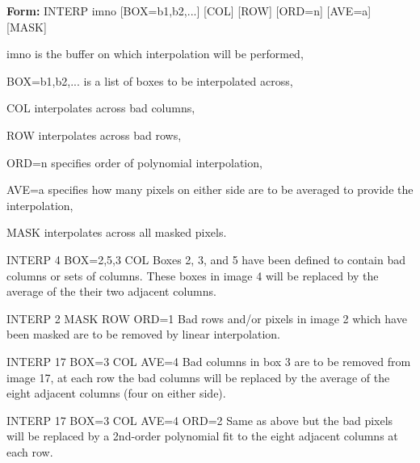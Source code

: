 {\newpage\clearpage
{}%
\begin{command}
  \item[\textbf{Form: }INTERP imno {[BOX=b1,b2,...]} {[COL]} {[ROW]} {[ORD=n]} {[AVE=a]} {[MASK]}\hfill]{}
  \item[imno]{is the buffer on which interpolation will be performed,}
  \item[BOX=b1,b2,...]{is a list of boxes to be interpolated across,}
  \item[COL]{interpolates across bad columns,}
  \item[ROW]{interpolates across bad rows,}
  \item[ORD=n]{specifies order of polynomial interpolation,}
  \item[AVE=a]{specifies how many pixels on either side are to be averaged 
       to provide the interpolation,}
  \item[MASK]{interpolates across all masked pixels.}
\end{command}%
\lthtmlfigureZ
\lthtmlcheckvsize\clearpage}

{\newpage\clearpage
{}%
\begin{example}
  \item[INTERP 4 BOX=2,5,3 COL\hfill]{Boxes 2, 3, and 5 have been defined
       to contain bad columns or sets of columns.  These boxes in image 4
       will be replaced by the average of the their two adjacent columns.}
\par\item[INTERP 2 MASK ROW ORD=1\hfill]{Bad rows and/or pixels in image 2
       which have been masked are to be removed by linear interpolation.}
\par\item[INTERP 17 BOX=3 COL AVE=4\hfill]{Bad columns in box 3 are to be
       removed from image 17, at each row the bad columns will be replaced
       by the average of the eight adjacent columns (four on either side).}
\par\item[INTERP 17 BOX=3 COL AVE=4 ORD=2\hfill]{Same as above but the bad
       pixels will be replaced by a 2nd-order polynomial fit to the eight
       adjacent columns at each row.}
\end{example}%
\lthtmlfigureZ
\lthtmlcheckvsize\clearpage}

